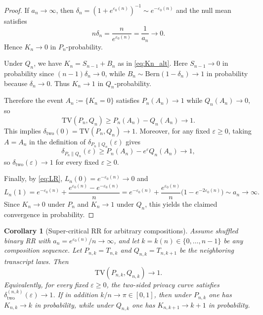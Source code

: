 \documentclass{article}
\newtheorem{corollary}[theorem]{Corollary}
\begin{document}
\begin{proof}
If $a_n \to \infty$, then $\delta_n = (1 + e^{\varepsilon_0(n)})^{-1} \sim e^{-\varepsilon_0(n)}$ and the null mean satisfies
\[
n\delta_n = \frac{n}{e^{\varepsilon_0(n)}} = \frac{1}{a_n} \to 0.
\]
Hence $K_n \to 0$ in $P_n$-probability.

Under $Q_n$, we have $K_n = S_{n-1} + B_n$ as in \eqref{eq:Kn_alt}. Here $S_{n-1} \to 0$ in probability since $(n-1)\delta_n \to 0$,
while $B_n \sim \mathrm{Bern}(1 - \delta_n) \to 1$ in probability because $\delta_n \to 0$. Thus $K_n \to 1$ in $Q_n$-probability.

Therefore the event $A_n := \{K_n = 0\}$ satisfies $P_n(A_n) \to 1$ while $Q_n(A_n) \to 0$, so
\[
\mathrm{TV}(P_n, Q_n) \geq P_n(A_n) - Q_n(A_n) \to 1.
\]
This implies $\delta_{\mathrm{two}}(0) = \mathrm{TV}(P_n, Q_n) \to 1$. Moreover, for any fixed $\varepsilon \geq 0$, taking $A = A_n$ in the
definition of $\delta_{P_n\|Q_n}(\varepsilon)$ gives
\[
\delta_{P_n\|Q_n}(\varepsilon) \geq P_n(A_n) - e^\varepsilon Q_n(A_n) \to 1,
\]
so $\delta_{\mathrm{two}}(\varepsilon) \to 1$ for every fixed $\varepsilon \geq 0$.

Finally, by \eqref{eq:LR}, $L_n(0) = e^{-\varepsilon_0(n)} \to 0$ and
\[
L_n(1) = e^{-\varepsilon_0(n)} + \frac{e^{\varepsilon_0(n)} - e^{-\varepsilon_0(n)}}{n} = e^{-\varepsilon_0(n)} + \frac{e^{\varepsilon_0(n)}}{n}\bigl(1 - e^{-2\varepsilon_0(n)}\bigr) \sim a_n \to \infty.
\]
Since $K_n \to 0$ under $P_n$ and $K_n \to 1$ under $Q_n$, this yields the claimed convergence in probability.
\end{proof}

\begin{corollary}[Super-critical RR for arbitrary compositions]
\label{cor:supercritical-compositions}
Assume shuffled binary RR with $a_n = e^{\varepsilon_0(n)}/n \to \infty$, and let $k = k(n) \in \{0, \ldots, n-1\}$ be any composition sequence. Let $P_{n,k} = T_{n,k}$ and $Q_{n,k} = T_{n,k+1}$ be the neighboring transcript laws. Then
\[
\mathrm{TV}(P_{n,k}, Q_{n,k}) \to 1.
\]
Equivalently, for every fixed $\varepsilon \geq 0$, the two-sided privacy curve satisfies $\delta^{(n,k)}_{\mathrm{two}}(\varepsilon) \to 1$. If in addition
$k/n \to \pi \in [0,1]$, then under $P_{n,k}$ one has $K_{n,k} \to k$ in probability, while under $Q_{n,k}$ one has
$K_{n,k+1} \to k+1$ in probability.
\end{corollary}
\end{document}
